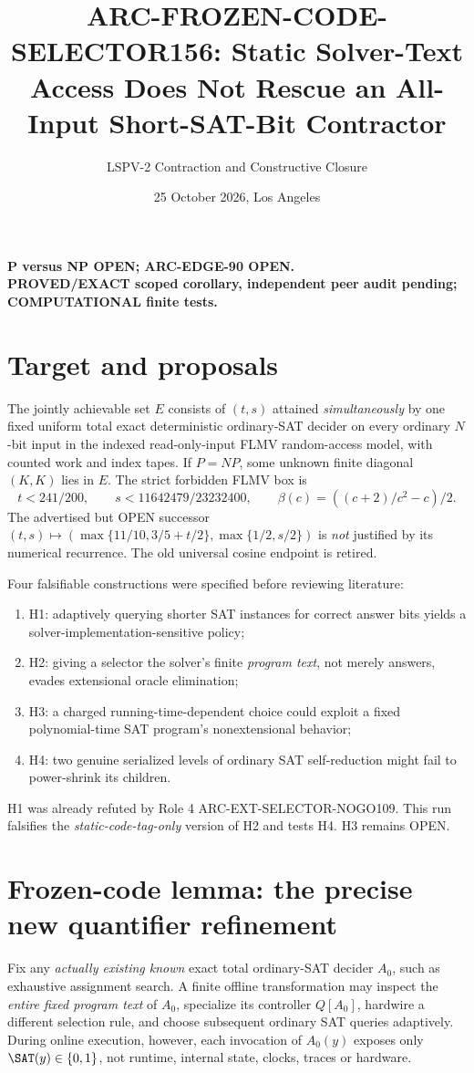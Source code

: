 \documentclass[11pt]{article}
\title{ARC-FROZEN-CODE-SELECTOR156: Static Solver-Text Access Does Not Rescue an All-Input Short-SAT-Bit Contractor}
\author{LSPV-2 Contraction and Constructive Closure}
\date{25 October 2026, Los Angeles}
\begin{document}
\maketitle
\begin{center}\textbf{P versus NP OPEN; ARC-EDGE-90 OPEN.}\\
\textbf{PROVED/EXACT scoped corollary, independent peer audit pending; COMPUTATIONAL finite tests.}\end{center}
\section{Target and proposals}
The jointly achievable set $E$ consists of $(t,s)$ attained \emph{simultaneously} by one fixed uniform total exact deterministic ordinary-SAT decider on every ordinary $N$-bit input in the indexed read-only-input FLMV random-access model, with counted work and index tapes. If $P=NP$, some unknown finite diagonal $(K,K)$ lies in $E$. The strict forbidden FLMV box is
\[
t<241/200,\qquad s<11642479/23232400,\qquad
\beta(c)=((c+2)/c^2-c)/2.
\]
The advertised but OPEN successor $(t,s)\mapsto(\max\{11/10,3/5+t/2\},\max\{1/2,s/2\})$ is \emph{not} justified by its numerical recurrence. The old universal cosine endpoint is retired.

Four falsifiable constructions were specified before reviewing literature:
\begin{enumerate}
\item[] H1: adaptively querying shorter SAT instances for correct answer bits yields a solver-implementation-sensitive policy;
\item[] H2: giving a selector the solver's finite \emph{program text}, not merely answers, evades extensional oracle elimination;
\item[] H3: a charged running-time-dependent choice could exploit a fixed polynomial-time SAT program's nonextensional behavior;
\item[] H4: two genuine serialized levels of ordinary SAT self-reduction might fail to power-shrink its children.
\end{enumerate}
H1 was already refuted by Role 4 ARC-EXT-SELECTOR-NOGO109. This run falsifies the \emph{static-code-tag-only} version of H2 and tests H4. H3 remains OPEN.

\section{Frozen-code lemma: the precise new quantifier refinement}
Fix any \emph{actually existing known} exact total ordinary-SAT decider $A_0$, such as exhaustive assignment search. A finite offline transformation may inspect the \emph{entire fixed program text} of $A_0$, specialize its controller $Q[A_0]$, hardwire a different selection rule, and choose subsequent ordinary SAT queries adaptively. During online execution, however, each invocation of $A_0(y)$ exposes only $\SAT(y)\in\{0,1\}$, not runtime, internal state, clocks, traces or hardware.
\end{document}
